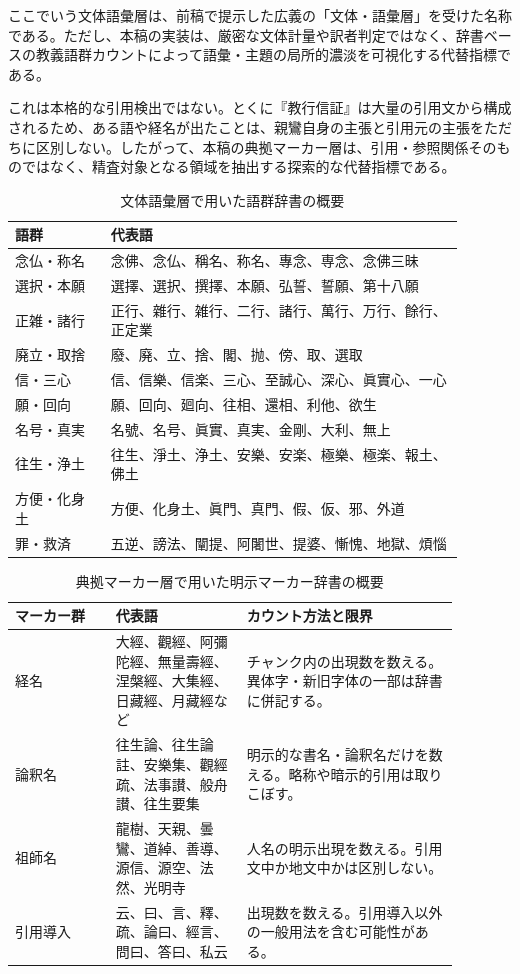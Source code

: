 \documentclass[uplatex,dvipdfmx,11pt,a4paper]{jsarticle}
\begin{document}
ここでいう文体語彙層は、前稿で提示した広義の「文体・語彙層」を受けた名称である。ただし、本稿の実装は、厳密な文体計量や訳者判定ではなく、辞書ベースの教義語群カウントによって語彙・主題の局所的濃淡を可視化する代替指標である。

これは本格的な引用検出ではない。とくに『教行信証』は大量の引用文から構成されるため、ある語や経名が出たことは、親鸞自身の主張と引用元の主張をただちに区別しない。したがって、本稿の典拠マーカー層は、引用・参照関係そのものではなく、精査対象となる領域を抽出する探索的な代替指標である。

\begin{table}[H]
\centering
\footnotesize
\caption{文体語彙層で用いた語群辞書の概要}
\label{tab:style-lexicon}
\begin{tabular}{@{}p{0.19\linewidth}p{0.70\linewidth}@{}}
\toprule
語群 & 代表語 \\
\midrule
念仏・称名 & 念佛、念仏、稱名、称名、專念、専念、念佛三昧 \\
選択・本願 & 選擇、選択、撰擇、本願、弘誓、誓願、第十八願 \\
正雑・諸行 & 正行、雜行、雑行、二行、諸行、萬行、万行、餘行、正定業 \\
廃立・取捨 & 廢、廃、立、捨、閣、抛、傍、取、選取 \\
信・三心 & 信、信樂、信楽、三心、至誠心、深心、眞實心、一心 \\
願・回向 & 願、回向、廻向、往相、還相、利他、欲生 \\
名号・真実 & 名號、名号、眞實、真実、金剛、大利、無上 \\
往生・浄土 & 往生、淨土、浄土、安樂、安楽、極樂、極楽、報土、佛土 \\
方便・化身土 & 方便、化身土、眞門、真門、假、仮、邪、外道 \\
罪・救済 & 五逆、謗法、闡提、阿闍世、提婆、慚愧、地獄、煩惱 \\
\bottomrule
\end{tabular}
\end{table}

\begin{table}[H]
\centering
\footnotesize
\caption{典拠マーカー層で用いた明示マーカー辞書の概要}
\label{tab:source-marker-lexicon}
\begin{tabular}{@{}p{0.20\linewidth}p{0.26\linewidth}p{0.42\linewidth}@{}}
\toprule
マーカー群 & 代表語 & カウント方法と限界 \\
\midrule
経名 & 大經、觀經、阿彌陀經、無量壽經、涅槃經、大集經、日藏經、月藏經など & チャンク内の出現数を数える。異体字・新旧字体の一部は辞書に併記する。 \\
論釈名 & 往生論、往生論註、安樂集、觀經疏、法事讃、般舟讃、往生要集 & 明示的な書名・論釈名だけを数える。略称や暗示的引用は取りこぼす。 \\
祖師名 & 龍樹、天親、曇鸞、道綽、善導、源信、源空、法然、光明寺 & 人名の明示出現を数える。引用文中か地文中かは区別しない。 \\
引用導入 & 云、曰、言、釋、疏、論曰、經言、問曰、答曰、私云 & 出現数を数える。引用導入以外の一般用法を含む可能性がある。 \\
\bottomrule
\end{tabular}
\end{table}
\end{document}
